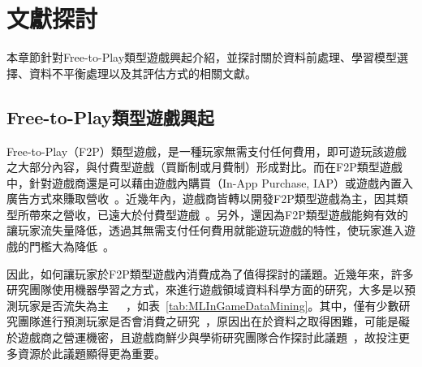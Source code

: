 \chapter{文獻探討}
\label{cha:RelatedWork}

本章節針對Free-to-Play類型遊戲興起介紹，並探討關於資料前處理、學習模型選擇、資料不平衡處理以及其評估方式的相關文獻。

\section{Free-to-Play類型遊戲興起}

Free-to-Play（F2P）類型遊戲，是一種玩家無需支付任何費用，即可遊玩該遊戲之大部分內容，與付費型遊戲（買斷制或月費制）形成對比。而在F2P類型遊戲中，針對遊戲商還是可以藉由遊戲內購買（In-App Purchase, IAP）或遊戲內置入廣告方式來賺取營收~\cite{wiki:f2p}。近幾年內，遊戲商皆轉以開發F2P類型遊戲為主，因其類型所帶來之營收，已遠大於付費型遊戲~\cite{lee2018game}。另外，還因為F2P類型遊戲能夠有效的讓玩家流失量降低，透過其無需支付任何費用就能遊玩遊戲的特性，使玩家進入遊戲的門檻大為降低~\cite{10.1007/978-3-030-27355-2_10}。

因此，如何讓玩家於F2P類型遊戲內消費成為了值得探討的議題。近幾年來，許多研究團隊使用機器學習之方式，來進行遊戲領域資料科學方面的研究，大多是以預測玩家是否流失為主~\cite{lee2018game}~\cite{10.1007/978-3-030-27355-2_10}~\cite{lee2016predicting}，如表~\ref{tab:MLInGameDataMining}。其中，僅有少數研究團隊進行預測玩家是否會消費之研究~\cite{sifa2015predicting}，原因出在於資料之取得困難，可能是礙於遊戲商之營運機密，且遊戲商鮮少與學術研究團隊合作探討此議題~\cite{lee2018game}，故投注更多資源於此議題顯得更為重要。
\newpage

